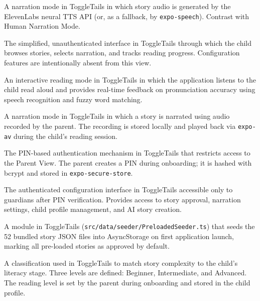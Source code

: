 \begin{description}[leftmargin=2.5cm, style=nextline]

\item[\textbf{AI Narration Mode}]
A narration mode in ToggleTails in which story audio is generated by the
ElevenLabs neural TTS API (or, as a fallback, by \texttt{expo-speech}).
Contrast with Human Narration Mode.

\item[\textbf{Child View}]
The simplified, unauthenticated interface in ToggleTails through which the
child browses stories, selects narration, and tracks reading progress.
Configuration features are intentionally absent from this view.

\item[\textbf{Help Me Read}]
An interactive reading mode in ToggleTails in which the application listens
to the child read aloud and provides real-time feedback on pronunciation
accuracy using speech recognition and fuzzy word matching.

\item[\textbf{Human Narration Mode}]
A narration mode in ToggleTails in which a story is narrated using audio
recorded by the parent. The recording is stored locally and played back via
\texttt{expo-av} during the child's reading session.

\item[\textbf{Parent Gate}]
The PIN-based authentication mechanism in ToggleTails that restricts access
to the Parent View. The parent creates a PIN during onboarding; it is hashed
with bcrypt and stored in \texttt{expo-secure-store}.

\item[\textbf{Parent View}]
The authenticated configuration interface in ToggleTails accessible only to
guardians after PIN verification. Provides access to story approval, narration
settings, child profile management, and AI story creation.

\item[\textbf{PreloadedSeeder}]
A module in ToggleTails (\texttt{src/data/seeder/PreloadedSeeder.ts}) that
seeds the 52 bundled story JSON files into AsyncStorage on first application
launch, marking all pre-loaded stories as approved by default.

\item[\textbf{Reading Level}]
A classification used in ToggleTails to match story complexity to the child's
literacy stage. Three levels are defined: Beginner, Intermediate, and
Advanced. The reading level is set by the parent during onboarding and stored
in the child profile.


\end{description}
